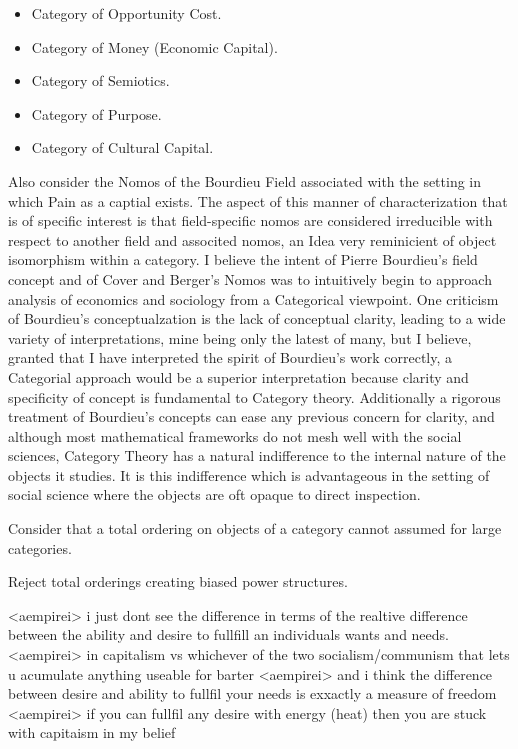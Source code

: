 \documentclass[11pt]{book}
\begin{document}
\begin{itemize}
	\item Category of Opportunity Cost.
	\item Category of Money (Economic Capital).
	\item Category of Semiotics.
	\item Category of Purpose.
	\item Category of Cultural Capital.
\end{itemize}

Also consider the Nomos of the Bourdieu Field associated with the setting in which Pain as a captial exists. The aspect of this manner of characterization that is of specific interest is that field-specific nomos are considered irreducible with respect to another field and associted nomos, an Idea very reminicient of object isomorphism within a category. I believe the intent of Pierre Bourdieu's field concept and of Cover and Berger's Nomos was to intuitively begin to approach analysis of economics and sociology from a Categorical viewpoint. One criticism of Bourdieu's conceptualzation is the lack of conceptual clarity, leading to a wide variety of interpretations, mine being only the latest of many, but I believe, granted that I have interpreted the spirit of Bourdieu's work correctly, a Categorial approach would be a superior interpretation because clarity and specificity of concept is fundamental to Category theory. Additionally a rigorous treatment of Bourdieu's concepts can ease any previous concern for clarity, and although most mathematical frameworks do not mesh well with the social sciences, Category Theory has a natural indifference to the internal nature of the objects it studies. It is this indifference which is advantageous in the setting of social science where the objects are oft opaque to direct inspection.

Consider that a total ordering on objects of a category cannot assumed for large categories.

Reject total orderings creating biased power structures.

<aempirei> i just dont see the difference in terms of the realtive difference between the ability and desire to fullfill an individuals wants and needs.
<aempirei> in capitalism vs whichever of the two socialism/communism that lets u acumulate anything useable for barter
<aempirei> and i think the difference between desire and ability to fullfil your needs is exxactly a measure of freedom
<aempirei> if you can fullfil any desire with energy (heat) then you are stuck with capitaism in my belief
\end{document}
